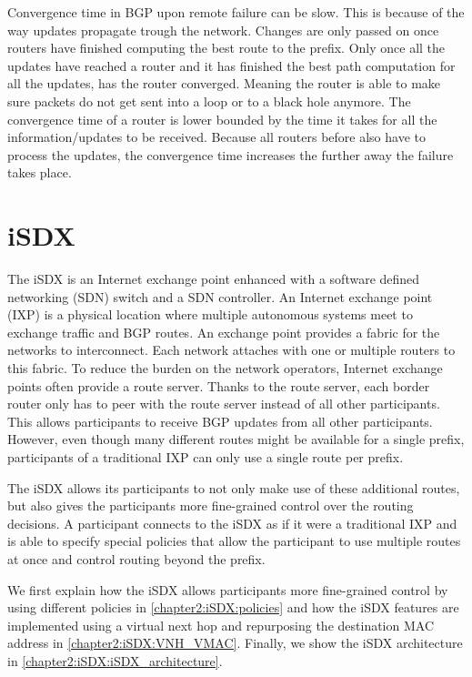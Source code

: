 Convergence time in BGP upon remote failure can be slow.
This is because of the way updates propagate trough the network. Changes are only passed on once routers have finished computing the best route to the prefix. Only once all the updates have reached a router and it has finished the best path computation for all the updates, has the router converged. Meaning the router is able to make sure packets do not get sent into a loop or to a black hole anymore. The convergence time of a router is lower bounded by the time it takes for all the information/updates to be received. Because all routers before also have to process  the updates, the convergence time increases the further away the failure takes place. 


\section{\label{chapter2:iSDX}iSDX}

The iSDX is an Internet exchange point enhanced with a software defined networking (SDN) switch and a SDN controller.
An Internet exchange point (IXP) is a physical location where multiple autonomous systems meet to exchange traffic and BGP routes. An exchange point provides a fabric for the networks to interconnect. Each network attaches with one or multiple routers to this fabric. To reduce the burden on the network operators, Internet exchange points often provide a route server. Thanks to the route server, each border router only has to peer with the route server instead of all other participants. This allows participants to receive BGP updates from all other participants. However, even though many different routes might be available for a single prefix, participants of a traditional IXP can only use a single route per prefix.

The iSDX allows its participants to not only make use of these additional routes, but also gives the participants  more fine-grained control over the routing decisions. A participant connects to the iSDX as if it were a traditional IXP and is able to specify special policies that allow the participant to use multiple routes at once and control routing beyond the prefix.

We first explain how the iSDX allows participants more fine-grained control by using different policies in \ref{chapter2:iSDX:policies} and how the iSDX features are implemented using a virtual next hop and repurposing the destination MAC address in \ref{chapter2:iSDX:VNH_VMAC}. Finally, we show the iSDX architecture in \ref{chapter2:iSDX:iSDX_architecture}.

